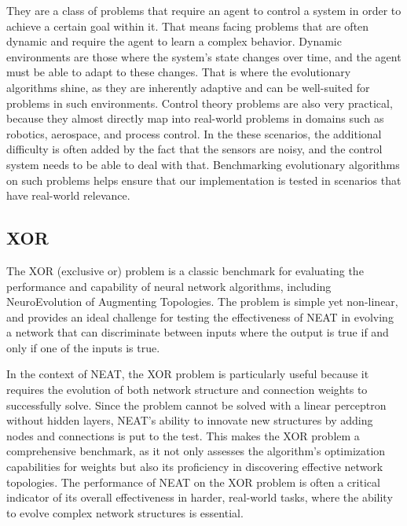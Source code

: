 \documentclass{article}
\begin{document}
    They are a class of problems that require an agent to control a system in order to achieve
    a certain goal within it.
    That means facing problems that are often dynamic and require the agent to learn a complex behavior. 
    Dynamic environments are those where the system's state changes over time, and the agent must be able to adapt to these changes.
    That is where the evolutionary algorithms shine, as they are inherently adaptive and can be well-suited for problems in such environments.
    Control theory problems are also very practical, because they almost directly map into real-world problems in domains such as robotics,
    aerospace, and process control. In the these scenarios, the additional difficulty is often added by the fact
    that the sensors are noisy, and the control system needs to be able to deal with that. 
    Benchmarking evolutionary algorithms on such problems helps ensure that our implementation
    is tested in scenarios that have real-world relevance.
    
        \subsection{XOR}
        The XOR (exclusive or) problem is a classic benchmark for evaluating the performance and capability of neural network algorithms,
        including NeuroEvolution of Augmenting Topologies.
        The problem is simple yet non-linear, and provides an ideal challenge for testing the effectiveness of NEAT in evolving
        a network that can discriminate between inputs where the output is true if and only if one of the inputs is true.

        In the context of NEAT, the XOR problem is particularly useful because it requires the evolution
        of both network structure and connection weights to successfully solve. Since the problem cannot
        be solved with a linear perceptron without hidden layers, NEAT's ability to innovate new structures by adding nodes and
        connections is put to the test. This makes the XOR problem a comprehensive benchmark,
        as it not only assesses the algorithm's optimization capabilities for weights but also its proficiency in discovering
        effective network topologies. The performance of NEAT on the XOR problem is often a critical
        indicator of its overall effectiveness in harder, real-world tasks,
        where the ability to evolve complex network structures is essential.
\end{document}

